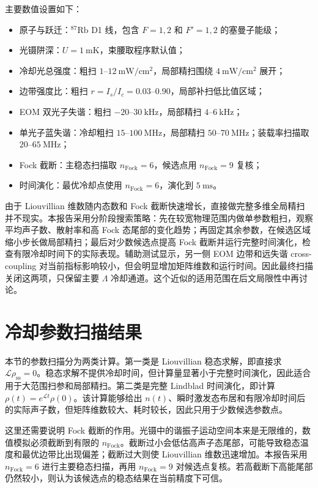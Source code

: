 \documentclass[UTF8,a4paper,12pt]{ctexart}
\newcommand{\Rb}{\ensuremath{^{87}\mathrm{Rb}}}
\begin{document}
主要数值设置如下：
\begin{itemize}
  \item 原子与跃迁：\Rb{} D1 线，包含 $F=1,2$ 和 $F'=1,2$ 的塞曼子能级；
  \item 光镊阱深：$U=1~\mathrm{mK}$，束腰取程序默认值；
  \item 冷却光总强度：粗扫 $1$--$12~\mathrm{mW/cm^2}$，局部精扫围绕 $4~\mathrm{mW/cm^2}$ 展开；
  \item 边带强度比：粗扫 $r=I_s/I_c=0.03$--$0.90$，局部补扫低比值区域；
  \item EOM 双光子失谐：粗扫 $-20$--$30~\mathrm{kHz}$，局部精扫 $4$--$6~\mathrm{kHz}$；
  \item 单光子蓝失谐：冷却粗扫 $15$--$100~\mathrm{MHz}$，局部精扫 $50$--$70~\mathrm{MHz}$；装载率扫描取 $20$--$65~\mathrm{MHz}$；
  \item Fock 截断：主稳态扫描取 $n_{\mathrm{Fock}}=6$，候选点用 $n_{\mathrm{Fock}}=9$ 复核；
  \item 时间演化：最优冷却点使用 $n_{\mathrm{Fock}}=6$，演化到 $5~\mathrm{ms}$。
\end{itemize}

由于 Liouvillian 维数随内态数和 Fock 截断快速增长，直接做完整多维全局精扫并不现实。本报告采用分阶段搜索策略：先在较宽物理范围内做单参数粗扫，观察平均声子数、散射率和高 Fock 态尾部的变化趋势；再固定其余参数，在候选区域缩小步长做局部精扫；最后对少数候选点提高 Fock 截断并运行完整时间演化，检查有限冷却时间下的实际表现。辅助测试显示，另一侧 EOM 边带和远失谐 cross-coupling 对当前指标影响较小，但会明显增加矩阵维数和运行时间。因此最终扫描关闭这两项，只保留主要 $\Lambda$ 冷却通道。这个近似的适用范围在后文局限性中再讨论。

\section{冷却参数扫描结果}

本节的参数扫描分为两类计算。第一类是 Liouvillian 稳态求解，即直接求
\(\mathcal{L}\rho_{\mathrm{ss}}=0\)。稳态求解不提供冷却时间，但计算量显著小于完整时间演化，因此适合用于大范围扫参和局部精扫。第二类是完整 Lindblad 时间演化，即计算 \(\rho(t)=e^{\mathcal{L}t}\rho(0)\)。该计算能够给出 \(n(t)\)、瞬时激发态布居和有限冷却时间后的实际声子数，但矩阵维数较大、耗时较长，因此只用于少数候选参数点。

这里还需要说明 Fock 截断的作用。光镊中的谐振子运动空间本来是无限维的，数值模拟必须截断到有限的 \(n_{\mathrm{Fock}}\)。截断过小会低估高声子态尾部，可能导致稳态温度和最优边带比出现偏差；截断过大则使 Liouvillian 维数迅速增加。本报告采用 \(n_{\mathrm{Fock}}=6\) 进行主要稳态扫描，再用 \(n_{\mathrm{Fock}}=9\) 对候选点复核。若高截断下高能尾部仍然较小，则认为该候选点的稳态结果在当前精度下可信。
\end{document}
